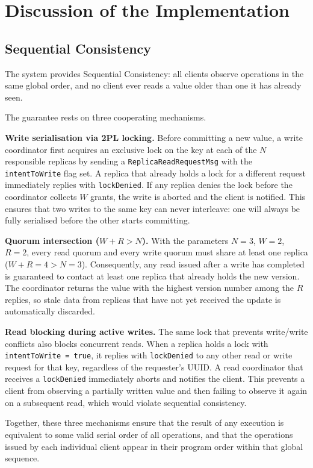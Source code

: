 \section{Discussion of the Implementation}

\subsection{Sequential Consistency}
The system provides Sequential Consistency: all clients observe operations in
the same global order, and no client ever reads a value older than one it has
already seen.

The guarantee rests on three cooperating mechanisms.

\textbf{Write serialisation via 2PL locking.}
Before committing a new value, a write coordinator first acquires an exclusive
lock on the key at each of the $N$ responsible replicas by sending a
\texttt{ReplicaReadRequestMsg} with the \texttt{intentToWrite} flag set. A
replica that already holds a lock for a different request immediately replies
with \texttt{lockDenied}. If any replica denies the lock before the coordinator
collects $W$ grants, the write is aborted and the client is notified. This
ensures that two writes to the same key can never interleave: one will always
be fully serialised before the other starts committing.

\textbf{Quorum intersection ($W + R > N$).}
With the parameters $N=3$, $W=2$, $R=2$, every read quorum and every write
quorum must share at least one replica ($W + R = 4 > N = 3$). Consequently,
any read issued after a write has completed is guaranteed to contact at least
one replica that already holds the new version. The coordinator returns the
value with the highest version number among the $R$ replies, so stale data
from replicas that have not yet received the update is automatically discarded.

\textbf{Read blocking during active writes.}
The same lock that prevents write/write conflicts also blocks concurrent reads.
When a replica holds a lock with \texttt{intentToWrite = true}, it replies with
\texttt{lockDenied} to any other read or write request for that key, regardless
of the requester's UUID. A read coordinator that receives a \texttt{lockDenied}
immediately aborts and notifies the client. This prevents a client from
observing a partially written value and then failing to observe it again on a
subsequent read, which would violate sequential consistency.

Together, these three mechanisms ensure that the result of any execution is
equivalent to some valid serial order of all operations, and that the
operations issued by each individual client appear in their program order
within that global sequence.

